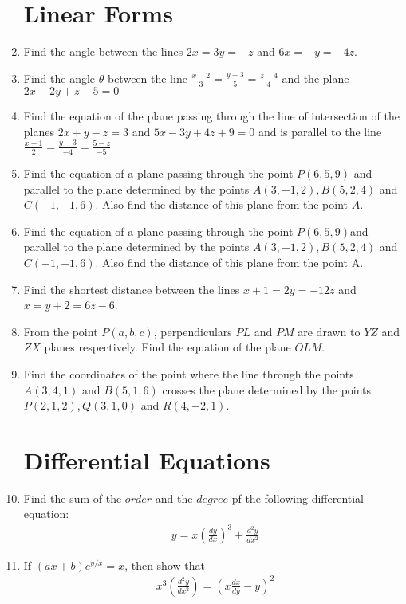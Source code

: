 \documentclass[12pt,-letter paper]{article}
\providecommand{\brak}[1]{\ensuremath{\left(#1\right)}}
\providecommand{\brak}[1]{\ensuremath{\left(#1\right)}}
\begin{document}
\begin{enumerate}
\section{Linear Forms}
    \item Find the angle between the lines
    $2x= 3y = -z$ and $6x = -y = -4z$.
    \item Find the angle $\theta$ between the line $\frac{x-2}{3}=\frac{y-3}{5}=\frac{z-4}{4}$ and the plane $2x-2y+z-5=0$
    \item Find the equation of the plane passing through the line of intersection of the planes $2x + y-z = 3$ and $5x-3y+4z + 9 = 0$ and is parallel to the line $\frac{x-1}{2}=\frac{y-3}{-4}=\frac{5-z}{-5}$
    \item Find the equation of a plane passing through the point $P(6, 5, 9)$ and parallel to the plane determined by the points $A(3, -1, 2), B(5, 2, 4)$ and $C(-1, -1, 6)$. Also find the distance of this plane from the point $A$.
    \item Find the equation of a plane passing through the point $P(6, 5, 9)$and parallel to the plane determined by the points $A(3, -1, 2), B(5, 2, 4)$ and $C(-1, -1, 6)$. Also find the distance of this plane from the point A.
    \item Find the shortest distance between the lines $x+1=2y=-12z$ and
    $x=y+2=6z-6$.
    \item From the point $P(a, b, c)$, perpendiculars $PL$ and $PM$ are drawn to $YZ$ and $ZX$ planes respectively. Find the equation of the plane $OLM$.
    \item Find the coordinates of the point where the line through the points $A(3,4,1)$ and $B(5,1,6)$ crosses the plane determined by the points $P(2,1,2), Q(3,1,0)$ and $R(4,-2,1)$.

\section{Differential Equations}
	\item Find the sum of the $order$ and the $degree$ pf the following differential equation:
    \begin{align*}
         y = x\brak{\frac{dy}{dx}}^3 + \frac{d^2y}{dx^2}
    \end{align*}
	
    \item If $(ax+b)e^{y/x} = x$, then show that
    \begin{align*}
        x^3\brak{\frac{d^2y}{dx^2}} = \brak{x\frac{dx}{dy}-y}^2
    \end{align*}
    

\end{enumerate}
\end{document}
